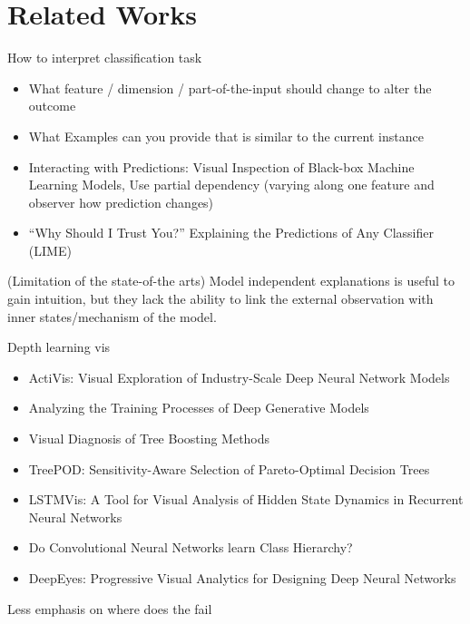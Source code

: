 \section{Related Works}

How to interpret classification task
\begin{itemize}
    \item What feature / dimension / part-of-the-input should change to
    alter the outcome
    \item What Examples can you provide that is similar to the current
    instance
\end{itemize}
\begin{itemize}
    \item Interacting with Predictions: Visual Inspection of Black-box Machine Learning Models,
    Use partial dependency (varying along one feature and observer how prediction changes)
    \item “Why Should I Trust You?” Explaining the Predictions of Any Classifier (LIME)
\end{itemize}

(Limitation of the state-of-the arts)
Model independent explanations is useful to gain intuition, but they lack the ability to link the external observation with inner states/mechanism of the model.

Depth learning vis
\begin{itemize}
    \item ActiVis: Visual Exploration of Industry-Scale Deep Neural Network Models
    \item Analyzing the Training Processes of Deep Generative Models
    \item Visual Diagnosis of Tree Boosting Methods
    \item TreePOD: Sensitivity-Aware Selection of Pareto-Optimal Decision Trees
    \item LSTMVis: A Tool for Visual Analysis of Hidden State Dynamics in Recurrent Neural Networks
    \item Do Convolutional Neural Networks learn Class Hierarchy?
    \item DeepEyes: Progressive Visual Analytics for Designing Deep Neural Networks
\end{itemize}

Less emphasis on where does the fail
